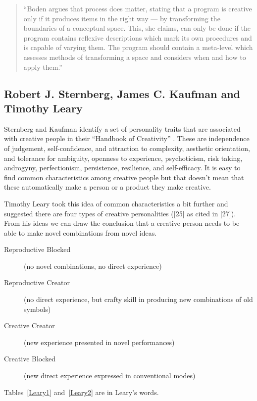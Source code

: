 \begin{quotation}
  ``Boden argues that process does matter, stating that a program is creative only if it produces items in the right way --- by transforming the boundaries of a conceptual space. This, she claims, can only be done if the program contains reflexive descriptions which mark its own procedures and is capable of varying them. The program should contain a meta-level which assesses methods of transforming a space and considers when and how to apply them.'' 
\end{quotation}


\subsection*{Robert J. Sternberg, James C. Kaufman and Timothy Leary}

Sternberg and Kaufman identify a set of personality traits that are associated with creative people in their ``Handbook of Creativity'' \autocite{Sternberg1999, Sternberg1999}. These are independence of judgement, self-confidence, and attraction to complexity, aesthetic orientation, and tolerance for ambiguity, openness to experience, psychoticism, risk taking, androgyny, perfectionism, persistence, resilience, and self-efficacy. It is easy to find common characteristics among creative people but that doesn't mean that these automatically make a person or a product they make creative.

Timothy Leary took this idea of common characteristics a bit further and suggested there are four types of creative personalities ([25] as cited in [27]). From his ideas we can draw the conclusion that a creative person needs to be able to make novel combinations from novel ideas.

\begin{description}
  \item [Reproductive Blocked] (no novel combinations, no direct experience)
  \item [Reproductive Creator] (no direct experience, but crafty skill in producing new combinations of old symbols)
  \item [Creative Creator] (new experience presented in novel performances)
  \item [Creative Blocked] (new direct experience expressed in conventional modes)
\end{description}

Tables~\ref{Leary1} and~\ref{Leary2} are in Leary's words.

